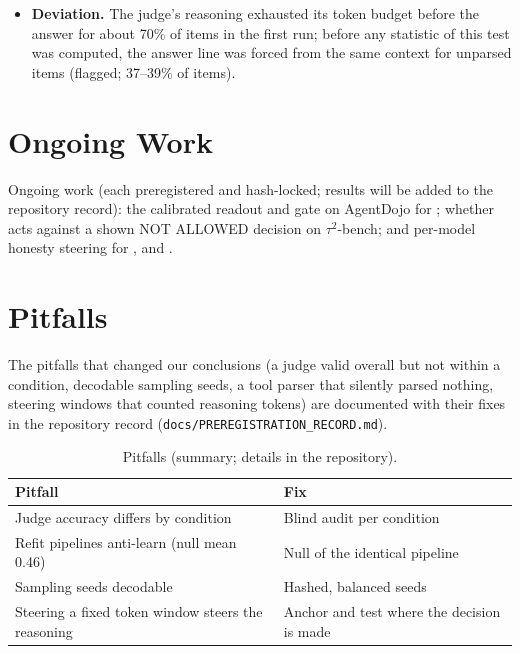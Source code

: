 \begin{itemize}
\item \textbf{Deviation.} The judge's reasoning exhausted its token budget before the answer for about 70\% of items in the first run; before any statistic of this test was computed, the answer line was forced from the same context for unparsed items (flagged; 37--39\% of items).
\end{itemize}

\section{Ongoing Work}
\label{app:pending}

Ongoing work (each preregistered and hash-locked; results will be added to the repository record): the calibrated readout and gate on AgentDojo for \Muse; whether \Muse acts against a shown NOT ALLOWED decision on $\tau^2$-bench; and per-model honesty steering for \Qwen, \Gemma and \Oss.

\section{Pitfalls}
\label{app:lessons}
The pitfalls that changed our conclusions (a judge valid overall but not within a condition, decodable sampling seeds, a tool parser that silently parsed nothing, steering windows that counted reasoning tokens) are documented with their fixes in the repository record (\texttt{docs/PREREGISTRATION\_RECORD.md}).
\begin{table}[h]\centering\scriptsize\caption{Pitfalls (summary; details in the repository).}\label{tab:lessons}
\begin{tabular}{@{}p{}p{}@{}}\toprule Pitfall & Fix\\\midrule
Judge accuracy differs by condition & Blind audit per condition\\
Refit pipelines anti-learn (null mean 0.46) & Null of the identical pipeline\\
Sampling seeds decodable & Hashed, balanced seeds\\
Steering a fixed token window steers the reasoning & Anchor and test where the decision is made\\\bottomrule\end{tabular}\end{table}
